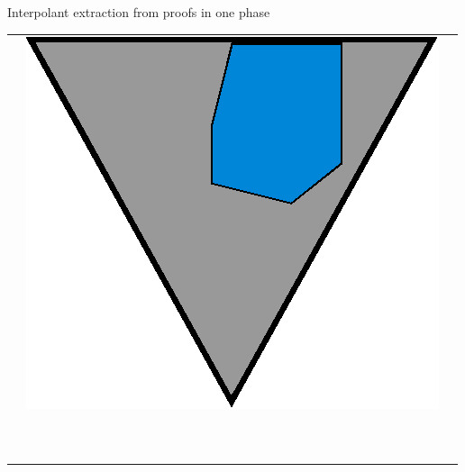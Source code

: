 \documentclass[final,hyperref={pdfpagelabels=true}]{beamer}
\newcommand{\colTwo}[1]{{\color{TuWienBlue}#1}}
\newcommand{\colB}[1]{\colTwo{#1}}
\newcommand{\gray}[1]{{\color{InfosysDarkGrey}#1}}
\begin{document}
\begin{frame}
\begin{columns}[t]
\begin{column}{\mycolwidth}
\begin{block}{Interpolant extraction from proofs in one phase}
\begin{tabular}{p{}ll}
					&
					\multicolumn{1}{m{\fakemulticolwidth}}{
						\includegraphics[width=\proofwidth]{figures/one_phase_draft_intermediate}
					}
					$\dots \forall {x_5} \dots \gray Q({x_5}, \colB c) \dots$
						\vspace*{0.5em}
					\\

	\multicolumn{2}{l}{
		\proofindent{\stagearrow} ~\parbox[c]{15em}{\raggedright\emph{ \onePhaseArrowLabel } }
						\vspace*{0.5em}
				}
				 \\




\end{tabular}
\end{block}
\end{column}
\end{columns}
\end{frame}
\end{document}
